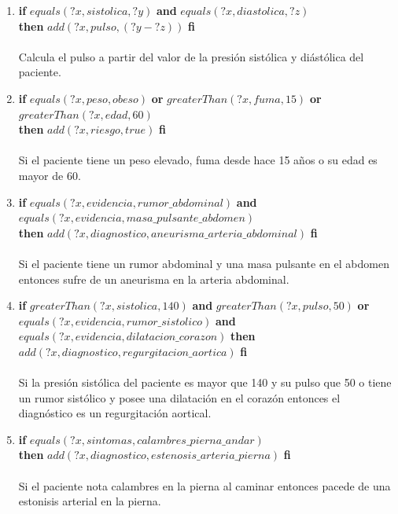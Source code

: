 \documentclass[10pt, a4paper,spanish]{article}
\begin{document}
			\begin{enumerate}[label={\textbf{R\theenumi:}}]

				\item
					\textbf{if} $equals(?x, sistolica, ?y)$ \textbf{and} $equals(?x, diastolica, ?z)$ \\
					\textbf{then} $add(?x, pulso, (?y - ?z) )$ \textbf{fi}
					\\ \\
					Calcula el pulso a partir del valor de la presión sistólica y diástólica del paciente.

				\item
					\textbf{if} $equals(?x, peso, obeso)$ \textbf{or} $greaterThan(?x, fuma, 15)$ \textbf{or} $greaterThan(?x, edad, 60)$ \\
					\textbf{then} $add(?x, riesgo, true)$ \textbf{fi}
 					\\ \\
					Si el paciente tiene un peso elevado, fuma desde hace 15 años o su edad es mayor de 60.

				\item
					\textbf{if} $equals(?x, evidencia, rumor\_abdominal)$ \textbf{and} $equals(?x, evidencia, masa\_pulsante\_abdomen)$ \\
					\textbf{then} $add(?x, diagnostico, aneurisma\_arteria\_abdominal)$ \textbf{fi}
					\\ \\
					Si el paciente tiene un rumor abdominal y una masa pulsante en el abdomen entonces sufre de un aneurisma en la arteria abdominal.

				\item
					\textbf{if} $greaterThan(?x, sistolica, 140)$ \textbf{and} $greaterThan(?x, pulso, 50)$ \textbf{or} \\
					\hspace*{0.5cm} $equals(?x, evidencia, rumor\_sistolico)$ \textbf{and} $equals(?x, evidencia, dilatacion\_corazon)$
					\textbf{then} $add(?x, diagnostico, regurgitacion\_aortica)$ \textbf{fi}
					\\ \\
					Si la presión sistólica del paciente es mayor que 140 y su pulso que 50 o tiene un rumor sistólico y posee una dilatación en el corazón entonces el diagnóstico es un regurgitación aortical.

				\item
					\textbf{if} $equals(?x, sintomas, calambres\_pierna\_andar)$ \\
					\textbf{then} $add(?x, diagnostico, estenosis\_arteria\_pierna)$ \textbf{fi}
					\\ \\
					Si el paciente nota calambres en la pierna al caminar entonces pacede de una estonisis arterial en la pierna.


\end{enumerate}
\end{document}
